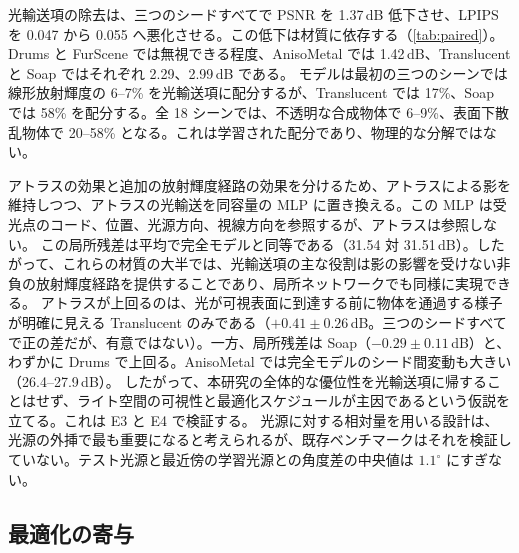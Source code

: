


光輸送項の除去は、三つのシードすべてで PSNR を 1.37\,dB 低下させ、LPIPS を 0.047 から 0.055 へ悪化させる。この低下は材質に依存する（\cref{tab:paired}）。Drums と FurScene では無視できる程度、AnisoMetal では 1.42\,dB、Translucent と Soap ではそれぞれ 2.29、2.99\,dB である。
モデルは最初の三つのシーンでは線形放射輝度の 6--7\% を光輸送項に配分するが、Translucent では 17\%、Soap では 58\% を配分する。全 18 シーンでは、不透明な合成物体で 6--9\%、表面下散乱物体で 20--58\% となる。これは学習された配分であり、物理的な分解ではない。

アトラスの効果と追加の放射輝度経路の効果を分けるため、アトラスによる影を維持しつつ、アトラスの光輸送を同容量の MLP に置き換える。この MLP は受光点のコード、位置、光源方向、視線方向を参照するが、アトラスは参照しない。
この局所残差は平均で完全モデルと同等である（31.54 対 31.51\,dB）。したがって、これらの材質の大半では、光輸送項の主な役割は影の影響を受けない非負の放射輝度経路を提供することであり、局所ネットワークでも同様に実現できる。
アトラスが上回るのは、光が可視表面に到達する前に物体を通過する様子が明確に見える Translucent のみである（$+0.41\pm0.26$\,dB。三つのシードすべてで正の差だが、有意ではない）。一方、局所残差は Soap（$-0.29\pm0.11$\,dB）と、わずかに Drums で上回る。AnisoMetal では完全モデルのシード間変動も大きい（26.4--27.9\,dB）。
したがって、本研究の全体的な優位性を光輸送項に帰することはせず、ライト空間の可視性と最適化スケジュールが主因であるという仮説を立てる。これは E3 と E4 で検証する。
光源に対する相対量を用いる設計は、光源の外挿で最も重要になると考えられるが、既存ベンチマークはそれを検証していない。テスト光源と最近傍の学習光源との角度差の中央値は $1.1^\circ$ にすぎない。




\subsection{最適化の寄与}
\label{sec:exp_optimization}
